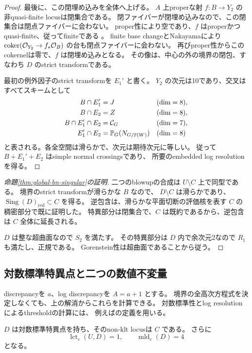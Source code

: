 \begin{proof}
最後に、この閉埋め込みを全体へ上げる。
$A$ 上properな射 $f:B\to Y_2$ の非quasi-finite locusは閉集合である。
閉ファイバーが閉埋め込みなので、この閉集合は閉点ファイバーに会わない。
proper性により空であり、$f$ はproperかつquasi-finite、従ってfiniteである
\cite{StacksProperFinite}。
finite base changeとNakayamaにより
$\operatorname{coker}(\mathcal O_{Y_2}\to f_*\mathcal O_B)$ の台も閉点ファイバーに会わない。
再びproper性からこのcokernelは零で、$f$ は閉埋め込みとなる。
その像は、中心の外の境界の閉包、すなわち $D$ のstrict transformである。

最初の例外因子のstrict transformを $E_1'$ と書く。
$Y_2$ の次元は10であり、交叉はすべてスキームとして
\[
 \begin{aligned}
 B\cap E_1'&=J &&(\dim=8),\\
 B\cap E_2&=Z &&(\dim=8),\\
 B\cap E_1'\cap E_2&=\mathcal C_G &&(\dim=7),\\
 E_1'\cap E_2&=\mathbb P_G(N_{G/\mathbb P(W)}) &&(\dim=8)
 \end{aligned}
\]
と表される。各全空間は滑らかで、次元は期待次元に等しい。
従って $B+E_1'+E_2$ はsimple normal crossingsであり、
所要のembedded log resolutionを得る。
\end{proof}

\begin{proof}[命題\ref{thm:global-bn-singular}の証明]
二つのblowupの合成は $U\setminus C$ 上で同型である。
境界のstrict transformが滑らかな $B$ なので、
$D\setminus C$ は滑らかであり、
$\operatorname{Sing}(D)_{\mathrm{red}}\subset C$ を得る。
逆包含は、滑らかな平面切断の評価核を表す $C$ の稠密部分で既に証明した。
特異部分は閉集合で、$C$ は既約であるから、逆包含は $C$ 全体に延長される。

$D$ は整な超曲面なので $S_2$ を満たす。
その特異部分は $D$ 内で余次元2なので $R_1$ も満たし、正規である。
Gorenstein性は超曲面であることから従う。
\end{proof}

\subsection{対数標準特異点と二つの数値不変量}

discrepancyを $a$、log discrepancyを $A=a+1$ とする。
境界の全高次方程式を決定しなくても、上の解消からこれらを計算できる。
対数標準性とlog resolutionによるthresholdの計算には、
例えば\cite[Section 1]{MustataSing}の定義を用いる。

\begin{theorem}\label{thm:bn-log-invariants}
$D$ は対数標準特異点を持ち、そのnon-klt locusは $C$ である。
さらに
\[
 \operatorname{lct}_e(U,D)=1,\qquad
 \operatorname{mld}_e(D)=4
\]
となる。
\end{theorem}

